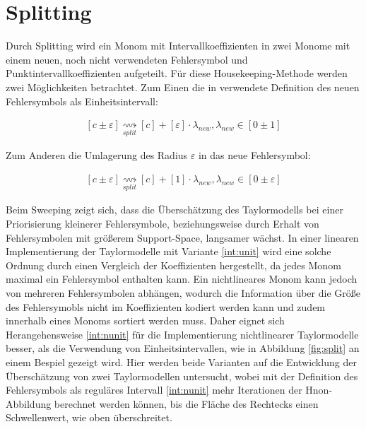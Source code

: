  
 
 \section{Splitting}
 Durch Splitting wird ein Monom mit Intervallkoeffizienten in zwei Monome mit einem neuen, noch nicht verwendeten Fehlersymbol und Punktintervallkoeffizienten aufgeteilt. Für diese Housekeeping-Methode werden zwei Möglichkeiten betrachtet. Zum Einen die in \cite{DBLP:conf/macis/BrausseKM15} verwendete Definition des neuen Fehlersymbols als Einheitsintervall:
 
\begin{align}
\label{int:unit}
 [c \pm \varepsilon]  \underset{split}{\rightsquigarrow} [c] + [\varepsilon] \cdot \lambda_{new}, \lambda_{new} \in [0 \pm 1]
\end{align}

Zum Anderen die Umlagerung des Radius $\varepsilon$ in das neue Fehlersymbol:

\begin{align}
\label{int:nunit}
 [c \pm \varepsilon]  \underset{split}{\rightsquigarrow} [c] + [1] \cdot \lambda_{new}, \lambda_{new} \in [0 \pm \varepsilon]
\end{align}
 
Beim Sweeping zeigt sich, dass die Überschätzung des Taylormodells bei einer Priorisierung kleinerer Fehlersymbole, beziehungsweise durch Erhalt von Fehlersymbolen mit größerem Support-Space, langsamer wächst. In einer linearen Implementierung der Taylormodelle mit Variante \ref{int:unit} wird eine solche Ordnung durch einen Vergleich der Koeffizienten hergestellt, da jedes Monom maximal ein Fehlersymbol enthalten kann. Ein nichtlineares Monom kann jedoch von mehreren Fehlersymbolen abhängen, wodurch die Information über die Größe des Fehlersymobls nicht im Koeffizienten kodiert werden kann und zudem innerhalb eines Monoms sortiert werden muss. Daher eignet sich Herangehensweise \ref{int:nunit} für die Implementierung nichtlinearer Taylormodelle besser, als die Verwendung von Einheitsintervallen, wie in Abbildung \ref{fig:split} an einem Bespiel gezeigt wird. Hier werden beide Varianten auf die Entwicklung der Überschätzung von zwei Taylormodellen untersucht, wobei mit der Definition des Fehlersymbols als reguläres Intervall \ref{int:nunit} mehr Iterationen der H\e non-Abbildung berechnet werden können, bis die Fläche des Rechtecks einen Schwellenwert, wie oben überschreitet.
 
 
